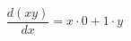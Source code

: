 \documentclass[12pt]{article}
\begin{document}
\sicpsize
\[
\frac{d(xy)}{dx} = x \cdot 0 + 1 \cdot y
\]
\end{document}
